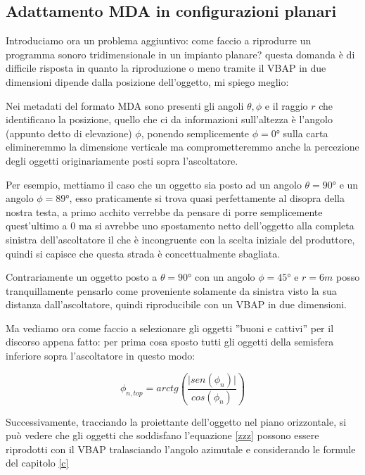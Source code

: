 \documentclass[12pt,a4paper]{report}
\begin{document}
\begin{itemize}
\subsection{Adattamento MDA in configurazioni planari}

Introduciamo ora un problema aggiuntivo: come faccio a riprodurre un programma sonoro tridimensionale in un impianto planare? questa domanda è di difficile risposta in quanto la riproduzione o meno tramite il VBAP in due dimensioni dipende dalla posizione dell'oggetto, mi spiego meglio:

Nei metadati del formato MDA sono presenti gli angoli $\theta, \phi$ e il raggio $r$ che identificano la posizione, quello che ci da informazioni sull'altezza è l'angolo (appunto detto di elevazione) $\phi$, ponendo semplicemente $\phi=0°$ sulla carta elimineremmo la dimensione verticale ma comprometteremmo anche la percezione degli oggetti originariamente posti sopra l'ascoltatore.

Per esempio, mettiamo il caso che un oggetto sia posto ad un angolo $	\theta= 90° $ e un angolo $\phi=89°$, esso praticamente si trova quasi perfettamente al disopra della nostra testa, a primo acchito verrebbe da pensare di porre semplicemente quest'ultimo a $0$ ma si avrebbe uno spostamento netto dell'oggetto alla completa sinistra dell'ascoltatore il che è incongruente con la scelta iniziale del produttore, quindi si capisce che questa strada è concettualmente sbagliata.

Contrariamente un oggetto posto a $	\theta= 90° $ con un angolo $\phi=45°$ e $r=6m$ posso tranquillamente pensarlo come proveniente solamente da sinistra visto la sua distanza dall'ascoltatore, quindi riproducibile con un VBAP in due dimensioni.

Ma vediamo ora come faccio a selezionare gli oggetti ''buoni e cattivi'' per il discorso appena fatto: per prima cosa sposto tutti gli oggetti della semisfera inferiore sopra l'ascoltatore in questo modo:

\begin{equation}
\phi_{n,top} = arctg  \left( \dfrac{\vert sen(\phi_n) \vert}{ cos(\phi_n) } \right)
\label{  b}
\end{equation}

Successivamente, tracciando la proiettante dell'oggetto nel piano orizzontale, si può vedere che gli oggetti che soddisfano l'equazione \ref{zzz} possono essere riprodotti con il VBAP tralasciando l'angolo azimutale e considerando le formule del capitolo \ref{c}


\end{itemize}
\end{document}
